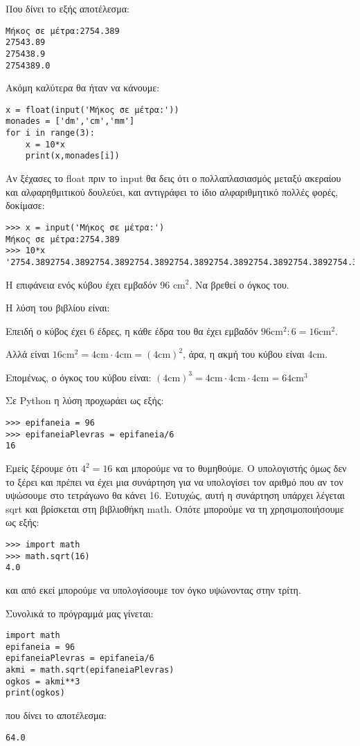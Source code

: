 Που δίνει το εξής αποτέλεσμα:
\begin{lstlisting}
Μήκος σε μέτρα:2754.389
27543.89
275438.9
2754389.0
\end{lstlisting}
Ακόμη καλύτερα θα ήταν να κάνουμε:
\begin{lstlisting}
x = float(input('Μήκος σε μέτρα:'))
monades = ['dm','cm','mm']
for i in range(3):
    x = 10*x
    print(x,monades[i])
\end{lstlisting}
Αν ξέχασες το float πριν το input θα δεις ότι ο πολλαπλασιασμός μεταξύ ακεραίου και αλφαρηθμιτικού δουλεύει, και αντιγράφει το ίδιο αλφαριθμητικό πολλές φορές, δοκίμασε:
\begin{lstlisting}
>>> x = input('Μήκος σε μέτρα:')
Μήκος σε μέτρα:2754.389
>>> 10*x
'2754.3892754.3892754.3892754.3892754.3892754.3892754.3892754.3892754.3892754.389'
\end{lstlisting}
\begin{exercise} 
Η επιφάνεια ενός κύβου έχει εμβαδόν 96 cm$^2$. Να βρεθεί ο όγκος του.
\end{exercise}
Η λύση του βιβλίου είναι:

Επειδή ο κύβος έχει 6 έδρες, η κάθε έδρα του θα έχει εμβαδόν $96\textrm{cm}^2 : 6 = 16\textrm{cm}^2$.

Αλλά είναι $16\textrm{cm}^2 = 4\textrm{cm} \cdot 4\textrm{cm} = (4\textrm{cm})^2$, άρα, η ακμή του κύβου είναι 4cm.

Επομένως, ο όγκος του κύβου είναι: $(4\textrm{cm})^3 = 4\textrm{cm} \cdot 4\textrm{cm} \cdot 4\textrm{cm} = 64 \textrm{cm}^3$

Σε Python η λύση προχωράει ως εξής:
\begin{lstlisting}
>>> epifaneia = 96
>>> epifaneiaPlevras = epifaneia/6
16
\end{lstlisting}

Εμείς ξέρουμε ότι $4^2=16$ και μπορούμε να το θυμηθούμε. Ο υπολογιστής όμως δεν το ξέρει και πρέπει να έχει μια συνάρτηση για να υπολογίσει τον αριθμό που αν τον υψώσουμε στο τετράγωνο θα κάνει 16. Ευτυχώς, αυτή η συνάρτηση υπάρχει λέγεται sqrt και βρίσκεται στη βιβλιοθήκη math. Οπότε μπορούμε να τη χρησιμοποιήσουμε ως εξής:
\begin{lstlisting}
>>> import math
>>> math.sqrt(16)
4.0
\end{lstlisting}
και από εκεί μπορούμε να υπολογίσουμε τον όγκο υψώνοντας στην τρίτη.

Συνολικά το πρόγραμμά μας γίνεται:
\begin{lstlisting}
import math
epifaneia = 96
epifaneiaPlevras = epifaneia/6
akmi = math.sqrt(epifaneiaPlevras)
ogkos = akmi**3
print(ogkos)
\end{lstlisting}
που δίνει το αποτέλεσμα:
\begin{lstlisting}
64.0
\end{lstlisting}


